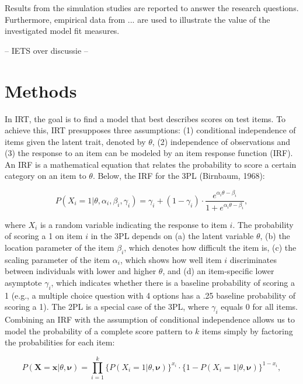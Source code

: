 \documentclass[Royal,sageapa,times,doublespace]{sagej}
\begin{document}
Results from the simulation studies are reported to answer the research questions. Furthermore, empirical data from ... are used to illustrate the value of the investigated model fit measures. 

-- IETS over discussie --

\section{Methods}
In IRT, the goal is to find a model that best describes scores on test items. To achieve this, IRT presupposes three assumptions: (1) conditional independence of items given the latent trait, denoted by $\theta$, (2) independence of observations and (3) the response to an item can be modeled by an item response function (IRF). An IRF is a mathematical equation that relates the probability to score a certain category on an item to $\theta$. Below, the IRF for the 3PL (Birnbaum, 1968):

\begin{equation}
P(X_i = 1 | \theta, \alpha_{i}, \beta_{i}, \gamma_{i}) = \gamma_{i} + (1 - \gamma_{i}) \cdot 
\frac{e^{\alpha_{i}\theta - \beta_{i}}}{1 + e^{\alpha_{i}\theta - \beta_{i}}},
\end{equation}

where $X_i$ is a random variable indicating the response to item $i$. The probability of scoring a 1 on item $i$ in the 3PL depends on (a) the latent variable $\theta$, (b) the location parameter of the item $\beta_{i}$, which denotes how difficult the item is, (c) the scaling parameter of the item $\alpha_{i}$, which shows how well item $i$ discriminates between individuals with lower and higher $\theta$, and (d) an item-specific lower asymptote $\gamma_{i}$, which indicates whether there is a baseline probability of scoring a 1 (e.g., a multiple choice question with 4 options has a .25 baseline probability of scoring a 1). The 2PL is a special case of the 3PL, where $\gamma_{i}$ equals 0 for all items. \\
\indent Combining an IRF with the assumption of conditional independence allows us to model the probability of a complete score pattern to $k$ items simply by factoring the probabilities for each item:

\begin{equation}
P(\boldsymbol{X} = \boldsymbol{x} | \theta, \boldsymbol{\nu}) = \prod_{i=1}^{k} \{P(X_i = 1 | \theta, \boldsymbol{\nu})\}^{x_i} \cdot  \{1 - P(X_i = 1 | \theta, \boldsymbol{\nu}) \}^{1 - x_i},
\end{equation}
\end{document}
